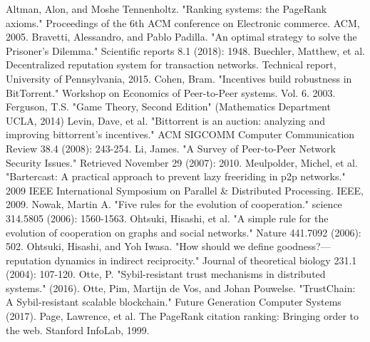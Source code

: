 \documentclass[11pt,a4paper]{article}
\theoremstyle{definition}
\theoremstyle{theorem}
\theoremstyle{proposition}
\theoremstyle{corollary}
\theoremstyle{lemma}
\theoremstyle{example}
\theoremstyle{remark}
\begin{document}
\begin{thebibliography}{9}
Altman, Alon, and Moshe Tennenholtz. "Ranking systems: the PageRank axioms." Proceedings of the 6th ACM conference on Electronic commerce. ACM, 2005.
Bravetti, Alessandro, and Pablo Padilla. "An optimal strategy to solve the Prisoner’s Dilemma." Scientific reports 8.1 (2018): 1948.
Buechler, Matthew, et al. Decentralized reputation system for transaction networks. Technical report, University of Pennsylvania, 2015.
Cohen, Bram. "Incentives build robustness in BitTorrent." Workshop on Economics of Peer-to-Peer systems. Vol. 6. 2003.
Ferguson, T.S. "Game Theory, Second Edition" (Mathematics Department UCLA, 2014) 
Levin, Dave, et al. "Bittorrent is an auction: analyzing and improving bittorrent's incentives." ACM SIGCOMM Computer Communication Review 38.4 (2008): 243-254.
Li, James. "A Survey of Peer-to-Peer Network Security Issues." Retrieved November 29 (2007): 2010.
Meulpolder, Michel, et al. "Bartercast: A practical approach to prevent lazy freeriding in p2p networks." 2009 IEEE International Symposium on Parallel \& Distributed Processing. IEEE, 2009.
Nowak, Martin A. "Five rules for the evolution of cooperation." science 314.5805 (2006): 1560-1563.
Ohtsuki, Hisashi, et al. "A simple rule for the evolution of cooperation on graphs and social networks." Nature 441.7092 (2006): 502.
Ohtsuki, Hisashi, and Yoh Iwasa. "How should we define goodness?—reputation dynamics in indirect reciprocity." Journal of theoretical biology 231.1 (2004): 107-120.
Otte, P. "Sybil-resistant trust mechanisms in distributed systems." (2016).
Otte, Pim, Martijn de Vos, and Johan Pouwelse. "TrustChain: A Sybil-resistant scalable blockchain." Future Generation Computer Systems (2017).
Page, Lawrence, et al. The PageRank citation ranking: Bringing order to the web. Stanford InfoLab, 1999. 

\end{thebibliography}
\end{document}
